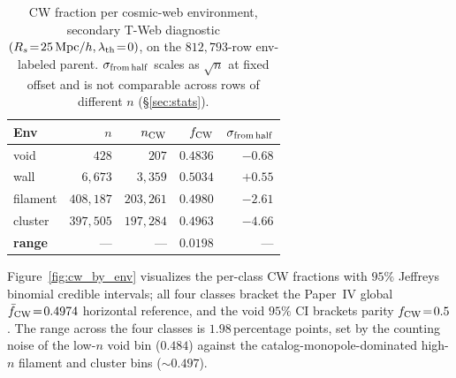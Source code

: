 \documentclass[aps,prd,twocolumn,superscriptaddress,showpacs,preprintnumbers,nofootinbib,longbibliography,floatfix]{revtex4-2}
\begin{document}
\begin{table}[!htbp]
\caption{CW fraction per cosmic-web environment, secondary T-Web
diagnostic $(R_s\!=\!25\,{\rm Mpc}/h, \lambda_{\rm th}\!=\!0)$, on the
$812{,}793$-row env-labeled parent. $\sigma_{\rm from\,half}$ scales
as $\sqrt{n}$ at fixed offset and is not comparable across rows of
different $n$ (\S\ref{sec:stats}).}
\label{tab:cw_vs_env}
\begin{ruledtabular}
\begin{tabular}{lrrrr}
Env & $n$ & $n_{\rm CW}$ & $f_{\rm CW}$ & $\sigma_{\rm from\,half}$ \\
\hline
void & $428$ & $207$ & $0.4836$ & $-0.68$ \\
wall & $6{,}673$ & $3{,}359$ & $0.5034$ & $+0.55$ \\
filament & $408{,}187$ & $203{,}261$ & $0.4980$ & $-2.61$ \\
cluster & $397{,}505$ & $197{,}284$ & $0.4963$ & $-4.66$ \\
\hline
\textbf{range} & --- & --- & $\mathbf{0.0198}$ & --- \\
\end{tabular}
\end{ruledtabular}
\end{table}

Figure~\ref{fig:cw_by_env} visualizes the per-class CW fractions with
$95\%$ Jeffreys binomial credible intervals; all four classes bracket
the Paper~IV global $\bar f_{\rm CW}\!=\!0.4974$ horizontal reference,
and the void $95\%$ CI brackets parity $f_{\rm CW}\!=\!0.5$. The
range across the four classes is $1.98$\,percentage points, set by
the counting noise of the low-$n$ void bin ($0.484$) against the
catalog-monopole-dominated high-$n$ filament and cluster bins
($\sim 0.497$).
\end{document}

